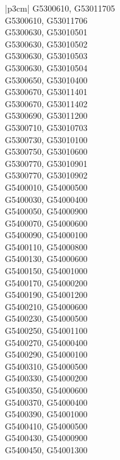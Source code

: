 \begin{customLongTable}{ |p{3cm}| }
G5300610, G53011705 \\ \hline
G5300610, G53011706 \\ \hline
G5300630, G53010501 \\ \hline
G5300630, G53010502 \\ \hline
G5300630, G53010503 \\ \hline
G5300630, G53010504 \\ \hline
G5300650, G53010400 \\ \hline
G5300670, G53011401 \\ \hline
G5300670, G53011402 \\ \hline
G5300690, G53011200 \\ \hline
G5300710, G53010703 \\ \hline
G5300730, G53010100 \\ \hline
G5300750, G53010600 \\ \hline
G5300770, G53010901 \\ \hline
G5300770, G53010902 \\ \hline
G5400010, G54000500 \\ \hline
G5400030, G54000400 \\ \hline
G5400050, G54000900 \\ \hline
G5400070, G54000600 \\ \hline
G5400090, G54000100 \\ \hline
G5400110, G54000800 \\ \hline
G5400130, G54000600 \\ \hline
G5400150, G54001000 \\ \hline
G5400170, G54000200 \\ \hline
G5400190, G54001200 \\ \hline
G5400210, G54000600 \\ \hline
G5400230, G54000500 \\ \hline
G5400250, G54001100 \\ \hline
G5400270, G54000400 \\ \hline
G5400290, G54000100 \\ \hline
G5400310, G54000500 \\ \hline
G5400330, G54000200 \\ \hline
G5400350, G54000600 \\ \hline
G5400370, G54000400 \\ \hline
G5400390, G54001000 \\ \hline
G5400410, G54000500 \\ \hline
G5400430, G54000900 \\ \hline
G5400450, G54001300 \\ \hline

\end{customLongTable}
